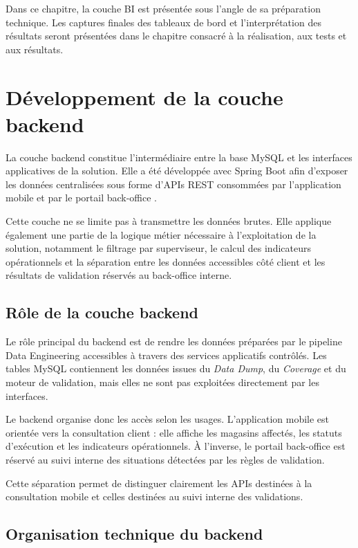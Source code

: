 Dans ce chapitre, la couche BI est présentée sous l’angle de sa préparation technique. Les captures finales des tableaux de bord et l’interprétation des résultats seront présentées dans le chapitre consacré à la réalisation, aux tests et aux résultats.

\section{Développement de la couche backend}

La couche backend constitue l’intermédiaire entre la base MySQL  et les interfaces applicatives de la solution. Elle a été développée avec Spring Boot afin d’exposer les données centralisées sous forme d’APIs REST consommées par l’application mobile et par le portail back-office \cite{springboot-doc}.

Cette couche ne se limite pas à transmettre les données brutes. Elle applique également une partie de la logique métier nécessaire à l’exploitation de la solution, notamment le filtrage par superviseur, le calcul des indicateurs opérationnels et la séparation entre les données accessibles côté client et les résultats de validation réservés au back-office interne.

\subsection{Rôle de la couche backend}

Le rôle principal du backend est de rendre les données préparées par le pipeline Data Engineering accessibles à travers des services applicatifs contrôlés. Les tables MySQL contiennent les données issues du \textit{Data Dump}, du \textit{Coverage} et du moteur de validation, mais elles ne sont pas exploitées directement par les interfaces.

Le backend organise donc les accès selon les usages. L’application mobile est orientée vers la consultation client : elle affiche les magasins affectés, les statuts d’exécution et les indicateurs opérationnels. À l’inverse, le portail back-office est réservé au suivi interne des situations détectées par les règles de validation.

Cette séparation permet de distinguer clairement les APIs destinées à la consultation mobile et celles destinées au suivi interne des validations.

\subsection{Organisation technique du backend}

